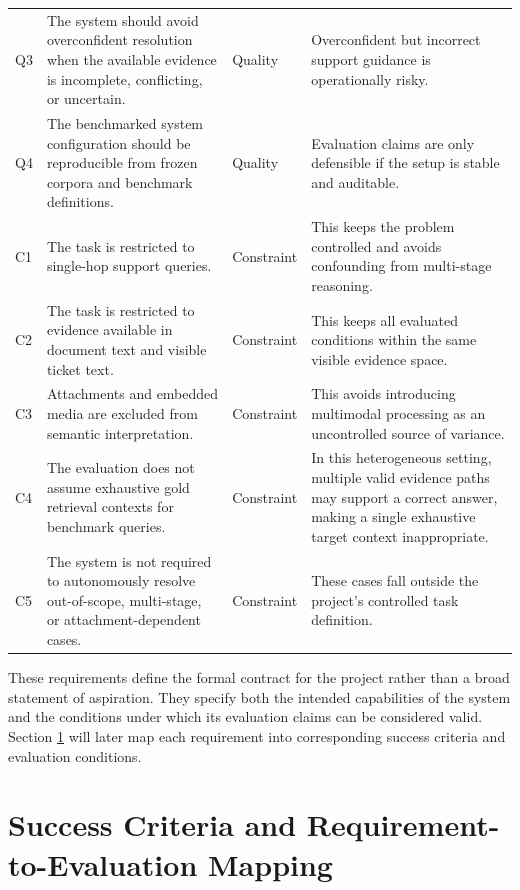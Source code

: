 \begin{longtable}{p{0.9cm} p{5.9cm} p{1.8cm} p{4.7cm}}
Q3 & The system should avoid overconfident resolution when the available evidence is incomplete, conflicting, or uncertain. & Quality & Overconfident but incorrect support guidance is operationally risky. \\

Q4 & The benchmarked system configuration should be reproducible from frozen corpora and benchmark definitions. & Quality & Evaluation claims are only defensible if the setup is stable and auditable. \\

C1 & The task is restricted to single-hop support queries. & Constraint & This keeps the problem controlled and avoids confounding from multi-stage reasoning. \\

C2 & The task is restricted to evidence available in document text and visible ticket text. & Constraint & This keeps all evaluated conditions within the same visible evidence space. \\

C3 & Attachments and embedded media are excluded from semantic interpretation. & Constraint & This avoids introducing multimodal processing as an uncontrolled source of variance. \\

C4 & The evaluation does not assume exhaustive gold retrieval contexts for benchmark queries. & Constraint & In this heterogeneous setting, multiple valid evidence paths may support a correct answer, making a single exhaustive target context inappropriate. \\

C5 & The system is not required to autonomously resolve out-of-scope, multi-stage, or attachment-dependent cases. & Constraint & These cases fall outside the project's controlled task definition. \\

\end{longtable}
\endgroup

These requirements define the formal contract for the project rather than a broad statement of aspiration. They specify both the intended capabilities of the system and the conditions under which its evaluation claims can be considered valid. Section \ref{sec:success_criteria} will later map each requirement into corresponding success criteria and evaluation conditions. 

\section{Success Criteria and Requirement-to-Evaluation Mapping}
\label{sec:success_criteria}

